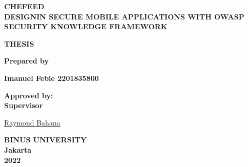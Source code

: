 \begingroup
    \centering
    {\Large\bfseries CHEFEED} \\
    {\large\bfseries DESIGNIN SECURE MOBILE APPLICATIONS WITH OWASP SECURITY KNOWLEDGE FRAMEWORK}

    \vspace{1.5cm}
    
    {\Large\bfseries THESIS}
    
    \vspace{1.5cm}

    {\large\bfseries Prepared by}

    \vspace{1.5cm}

    {\large\bfseries Imanuel Febie 2201835800}

    \vspace{1.5cm}
    
    \begin{flushleft}
        \bfseries
        Approved by: \\
        Supervisor \\

        \vspace{2cm}

        \underline{Raymond Bahana} \\
    \end{flushleft}

    \vspace{1.5cm}

    {\large\bfseries BINUS UNIVERSITY \\ Jakarta \\ 2022}

\endgroup
